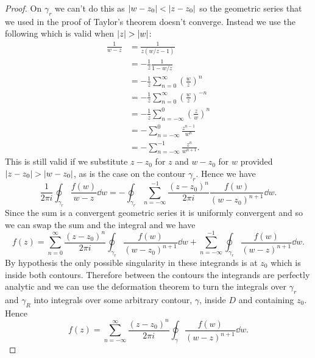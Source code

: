 \documentclass{article}
\begin{document}
\begin{proof}
        On \(\gamma_r\) we can't do this as \(\abs{w - z_0} < \abs{z - z_0}\) so the geometric series that we used in the proof of Taylor's theorem doesn't converge.
        Instead we use the following which is valid when \(\abs{z} > \abs{w}\):
        \begin{align*}
            \frac{1}{w - z} &= \frac{1}{z(w/z - 1)}\\
            &= -\frac{1}{z} \frac{1}{1 - w/z}\\
            &= -\frac{1}{z} \sum_{n=0}^{\infty} \left( \frac{w}{z} \right)^n\\
            &= -\frac{1}{z}\sum_{n=0}^{\infty} \left( \frac{w}{z} \right)^{-n}\\
            &= -\frac{1}{z}\sum_{n=-\infty}^{0} \left( \frac{z}{w} \right)^n\\
            &= -\sum_{n=-\infty}^{0} \frac{z^{n-1}}{w^n}\\
            &= -\sum_{n=-\infty}^{-1} \frac{z^{n}}{w^{n+1}}.
        \end{align*}
        This is still valid if we substitute \(z - z_0\) for \(z\) and \(w - z_0\) for \(w\) provided \(\abs{z - z_0} > \abs{w - z_0}\), as is the case on the contour \(\gamma_r\).
        Hence we have
        \[\frac{1}{2\pi i}\oint_{\gamma_r} \frac{f(w)}{w - z}\dd{w} = -\oint_{\gamma_r}\sum_{n=-\infty}^{-1}\frac{(z - z_0)^n}{2\pi i}\frac{f(w)}{(w - z_0)^{n+1}} \dd{w}.\]
        Since the sum is a convergent geometric series it is uniformly convergent and so we can swap the sum and the integral and we have
        \[f(z) = \sum_{n=0}^{\infty} \frac{(z - z_0)^n}{2\pi i} \oint_{\gamma_r} \frac{f(w)}{(w - z_0)^{n+1}} \dd{w} + \sum_{n = -\infty}^{-1} \oint_{\gamma_r} \frac{f(w)}{(w - z)^{n+1}}\dd{w}.\]
        By hypothesis the only possible singularity in these integrands is at \(z_0\) which is inside both contours.
        Therefore between the contours the integrands are perfectly analytic and we can use the deformation theorem to turn the integrals over \(\gamma_r\) and \(\gamma_R\) into integrals over some arbitrary contour, \(\gamma\), inside \(D\) and containing \(z_0\).
        Hence
        \[f(z) = \sum_{n=-\infty}^{\infty} \frac{(z - z_0)^n}{2\pi i} \oint_{\gamma} \frac{f(w)}{(w - z)^{n+1}} \dd{w}.\]
    \end{proof}
    
\end{document}
